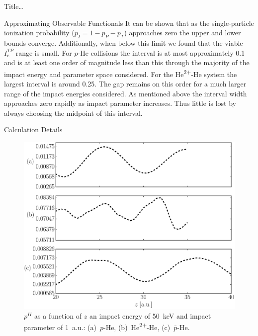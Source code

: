 \documentclass[letterpaper, 11 pt]{report}
\begin{document}
\begin{chapter}{ Title\dots \label{chap:p-he2p-he}}
\begin{section}{Approximating Observable Functionals \label{sec:phe2p-obs}}
      It can be shown that as the single-particle ionization probability ($p_I = 1 - p_P - p_T$)
      approaches zero the upper and lower bounds converge. Additionally, when below this limit we found
      that the viable $I_\mathrm{c}^{TP}$ range is small. For $p$-He collisions the interval is at most
      approximately 0.1 and is at least one order of magnitude less than this through the majority of the
      impact energy and parameter space considered. For the He\textsuperscript{2+}-He system the largest
      interval is around 0.25. The gap remains on this order for a much larger range of the impact
      energies considered. As mentioned above the interval width approaches zero rapidly as impact
      parameter increases. Thus little is lost by always choosing the midpoint of this interval.

   \end{section}

   \begin{section}{Calculation Details \label{sec:phe2p-det}}
      
      \begin{figure}[ht]
         \begin{minipage}{.49\linewidth}
            
            \centering
            \includegraphics[width = \linewidth]{./images/poz.eps}
            \caption[Probabilities as a function of nuclear separation.]{$p^{II}$ as a
                     function of $z$ an impact energy of 50~keV and impact parameter of 1~a.u.:
                     (a)~$p$-He, (b)~He\textsuperscript{2+}-He, (c)~$\bar{p}$-He. \label{fig:poz}}
         \end{minipage} \hspace{0.04\linewidth} %
         \begin{minipage}{.49\linewidth}
            

\end{minipage}
\end{figure}
\end{section}
\end{chapter}
\end{document}
